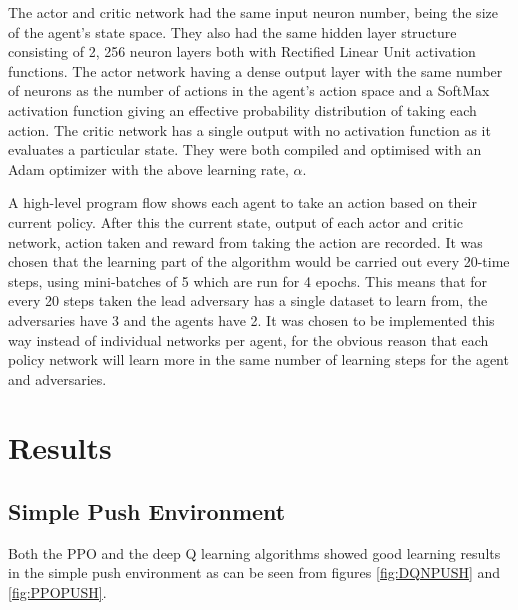 \documentclass{article}
\begin{document}
The actor and critic network had the same input neuron number, being the size of the agent's state space.
They also had the same hidden layer structure consisting of 2, 256 neuron layers both with Rectified Linear Unit activation functions.
The actor network having a dense output layer with the same number of neurons as the number of actions in the agent's action space and a SoftMax activation function giving an effective probability distribution of taking each action.
The critic network has a single output with no activation function as it evaluates a particular state. They were both compiled and optimised with an Adam optimizer \citet{adam-optimiser} with the above learning rate, $\alpha$.

A high-level program flow shows each agent to take an action based on their current policy.
After this the current state, output of each actor and critic network, action taken and reward from taking the action are recorded.
It was chosen that the learning part of the algorithm would be carried out every 20-time steps, using mini-batches of 5 which are run for 4 epochs.
This means that for every 20 steps taken the lead adversary has a single dataset to learn from, the adversaries have 3 and the agents have 2.
It was chosen to be implemented this way instead of individual networks per agent, for the obvious reason that each policy network will learn more in the same number of learning steps for the agent and adversaries.

\section{Results} \label{Results}

\subsection{Simple Push Environment}

Both the PPO and the deep Q learning algorithms showed good learning results in the simple push environment as can be seen from figures \ref{fig:DQNPUSH} and \ref{fig:PPOPUSH}.
\end{document}
